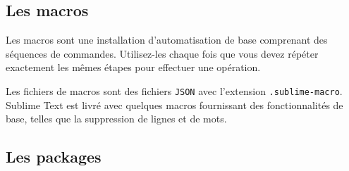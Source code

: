 \documentclass[french,a4paper]{article}
\begin{document}
\subsection*{Les macros}
Les macros sont une installation d'automatisation de base comprenant des 
séquences de commandes. Utilisez-les chaque fois que vous devez répéter 
exactement les mêmes étapes pour effectuer une opération.
\medskip

Les fichiers de macros sont des fichiers \texttt{JSON} avec l'extension 
\texttt{.sublime-macro}. Sublime Text est livré avec quelques macros 
fournissant des fonctionnalités de base, telles que la suppression de lignes et
de mots.
\bigskip

\subsection*{Les packages}
\end{document}
